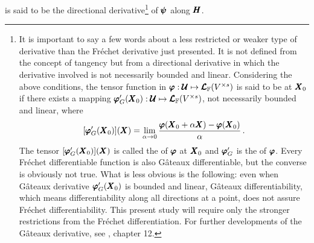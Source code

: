 is said to be the directional derivative\footnote{It is important to say a few words about a less restricted or weaker type of derivative than the Fr\'echet derivative just presented. It is not defined from the concept of tangency but from a directional derivative in which the derivative involved is not necessarily bounded and linear. Considering the above conditions, the tensor function in $\pmb{\varphi} : \pmb{\mathcal{U}} \mapsto \pmb{\mathcal{L}}_{\mathbb{F}}(V^{\times s})$ is said to be  at $\pmb{X}_0$ if there exists a mapping $\pmb{\varphi}'_G(\pmb{X}_0) : \pmb{\mathcal{U}} \mapsto \pmb{\mathcal{L}}_{\mathbb{F}}(V^{\times s})$, not necessarily bounded and linear, where
\begin{equation*}
[\pmb{\varphi}'_G(\pmb{X}_0)](\pmb{X})=\lim_{\alpha\to 0} \dfrac{\pmb{\varphi}(\pmb{X}_0+\alpha\pmb{X})-\pmb{\varphi}(\pmb{X}_0)}{\alpha}\,.
\end{equation*}
The tensor $[\pmb{\varphi}'_G(\pmb{X}_0)](\pmb{X})$ is called the  of $\pmb{\varphi}$ at $\pmb{X}_0$ and $\pmb{\varphi}'_G$ is the  of $\pmb{\varphi}$. Every Fr\'echet differentiable function is also G\^ateaux differentiable, but the converse is obviously not true. What is less obvious is the following: even when G\^ateaux derivative $\pmb{\varphi}'_G(\pmb{X}_0)$ is bounded and linear, G\^ateaux differentiability, which means differentiability along all directions at a point, does not assure Fr\'echet differentiability. This present study will require only the stronger restrictions from the Fr\'echet differentiation. For further developments of the G\^ateaux derivative, see \cite{wouk_1979_1}, chapter 12.} of $\pmb{\psi}$ along $\pmb{H}$. 

